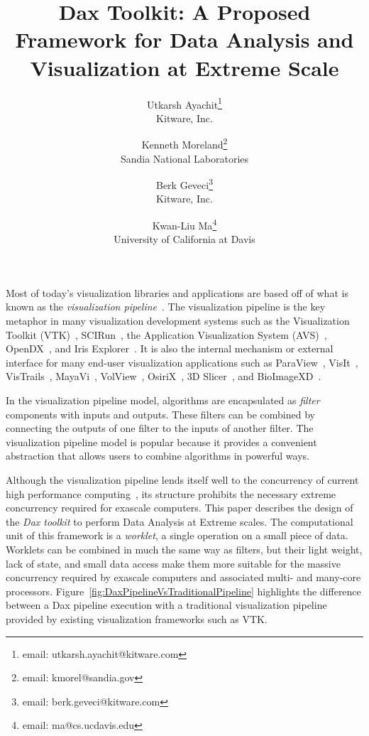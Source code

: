 \documentclass{vgtc}                          %
\title{Dax Toolkit: A Proposed Framework for Data Analysis and Visualization at Extreme Scale}
\author{
  Utkarsh Ayachit\thanks{email: utkarsh.ayachit@kitware.com} \\ %
  \scriptsize Kitware, Inc. %
  \and %
  Kenneth Moreland\thanks{email: kmorel@sandia.gov} \\ %
  \scriptsize Sandia National Laboratories %
  \and %
  Berk Geveci\thanks{email: berk.geveci@kitware.com} \\ %
  \scriptsize Kitware, Inc. %
  \and %
  Kwan-Liu Ma\thanks{email: ma@cs.ucdavis.edu} \\ %
  \scriptsize University of California at Davis %
}
\newcommand*{\lcite}[1]{~\cite{#1}}
\newcommand*{\keyterm}[1]{\emph{#1}}
\begin{document}


\maketitle

\label{sec:Introduction}

Most of today's visualization libraries and applications are based off of
what is known as the \keyterm{visualization
  pipeline}\lcite{Haeberli88,Lucas92}.  The visualization pipeline is the
key metaphor in many visualization development systems such as the
Visualization Toolkit (VTK)\lcite{VTKBook}, SCIRun\lcite{SCIRunPaper}, the
Application Visualization System (AVS)\lcite{AVSPaper},
OpenDX\lcite{OpenDXPaper}, and Iris Explorer\lcite{IRISExplorerPaper}.  It
is also the internal mechanism or external interface for many end-user
visualization applications such as ParaView\lcite{ParaViewGuideBook},
VisIt\lcite{VisItBook}, VisTrails\lcite{VisTrailsPaper},
MayaVi\lcite{MayaViPaper}, VolView\lcite{VolViewBook},
OsiriX\lcite{OsiriXPaper}, 3D Slicer\lcite{3DSlicerPaper}, and
BioImageXD\lcite{BioImageXDPaper}.

In the visualization pipeline model, algorithms are encapsulated as
\keyterm{filter} components with inputs and outputs.  These filters can
be combined by connecting the outputs of one filter to the inputs of
another filter.  The visualization pipeline model is popular because it
provides a convenient abstraction that allows users to combine algorithms
in powerful ways.

Although the visualization pipeline lends itself well to the concurrency of
current high performance
computing\lcite{Childs10,Moreland08,Patchett09,Pugmire08,White05}, its structure
prohibits the necessary extreme concurrency required for exascale
computers.  This paper describes the design of the \keyterm{Dax toolkit} to
perform Data Analysis at Extreme scales.  The computational unit of this
framework is a \keyterm{worklet}, a single operation on a small piece of data.
Worklets can be combined in much the same way as filters, but their light
weight, lack of state, and small data access make them more suitable for
the massive concurrency required by exascale computers and associated
multi- and many-core processors.
Figure~\ref{fig:DaxPipelineVsTraditionalPipeline} highlights the difference
between a Dax pipeline
execution with a traditional visualization pipeline provided by existing
visualization frameworks such as VTK.
\end{document}
